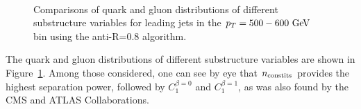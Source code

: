 \begin{figure}
\begin{center}
\\
\caption{Comparisons of quark and gluon distributions of different substructure variables for leading jets in the 
$\pt=500-600 \GeV$ bin using the anti-\kT R=0.8 algorithm. }
\label{fig:qg_pt500_subst_AKt_R08}
\end{center}
\end{figure}

The quark and gluon distributions of different substructure variables
are shown in Figure~\ref{fig:qg_pt500_subst_AKt_R08}. Among those
considered, one can see by eye that $n_{\rm constits}$ provides the highest separation
power, followed by $C_1^{\beta=0}$ and $C_1^{\beta=1}$, as was also
found by the CMS and ATLAS Collaborations. 

